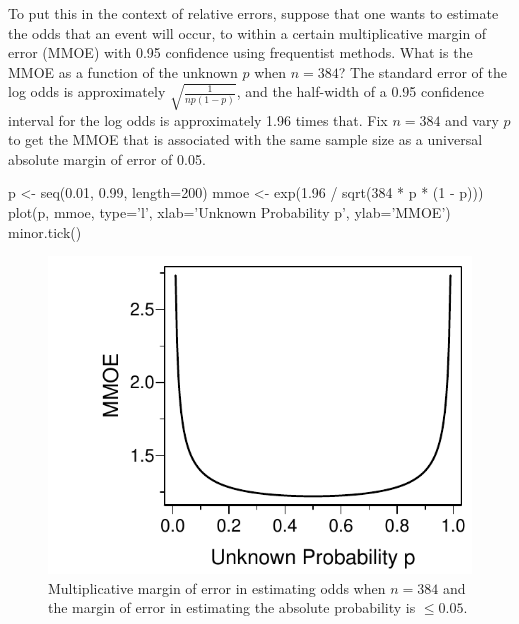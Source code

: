 To put this in the context of relative errors, suppose that one wants
to estimate the odds that an event will occur, to within a certain
multiplicative margin of error (MMOE) with 0.95 confidence using
frequentist methods.  What is
the MMOE as a function of the unknown $p$ when $n=384$?  The standard
error of the log odds is approximately $\sqrt{\frac{1}{n p (1 - p)}}$,
and the half-width of a 0.95 confidence interval for the log odds is
approximately 1.96 times that.  Fix $n=384$ and vary $p$ to get the
MMOE that is associated with the same sample size as a universal
absolute margin of error of 0.05.

\begin{Schunk}
\begin{Sinput}
p <- seq(0.01, 0.99, length=200)
mmoe <- exp(1.96 / sqrt(384 * p * (1 - p)))
plot(p, mmoe, type='l', xlab='Unknown Probability p', ylab='MMOE')
minor.tick()
\end{Sinput}
\begin{figure}[htbp]

\centerline{\includegraphics[width=\maxwidth]{htest-moeor-1} }

\caption[Multiplicative margin of error in estimating odds when $n=384$ and the margin of error in estimating the absolute probability is $\leq 0.05$]{Multiplicative margin of error in estimating odds when $n=384$ and the margin of error in estimating the absolute probability is $\leq 0.05$.}\label{fig:htest-moeor}
\end{figure}
\end{Schunk}

